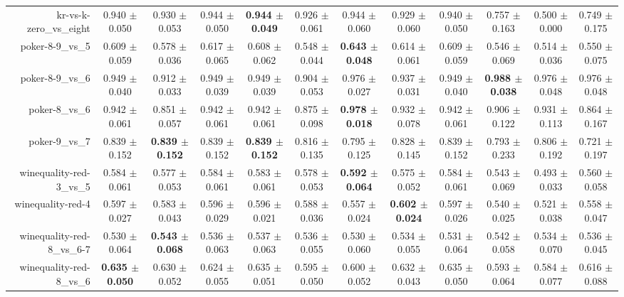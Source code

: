 \begin{table}[!ht]
{\begin{tabular}{r c c c c c c c c c c c}
kr-vs-k-zero\_vs\_eight & 0.940 $\pm$ 0.050 & 0.930 $\pm$ 0.053 & 0.944 $\pm$ 0.050 & \textbf{0.944 $\pm$ 0.049} & 0.926 $\pm$ 0.061 & 0.944 $\pm$ 0.060 & 0.929 $\pm$ 0.060 & 0.940 $\pm$ 0.050 & 0.757 $\pm$ 0.163 & 0.500 $\pm$ 0.000 & 0.749 $\pm$ 0.175 \\
poker-8-9\_vs\_5 & 0.609 $\pm$ 0.059 & 0.578 $\pm$ 0.036 & 0.617 $\pm$ 0.065 & 0.608 $\pm$ 0.062 & 0.548 $\pm$ 0.044 & \textbf{0.643 $\pm$ 0.048} & 0.614 $\pm$ 0.061 & 0.609 $\pm$ 0.059 & 0.546 $\pm$ 0.069 & 0.514 $\pm$ 0.036 & 0.550 $\pm$ 0.075 \\
poker-8-9\_vs\_6 & 0.949 $\pm$ 0.040 & 0.912 $\pm$ 0.033 & 0.949 $\pm$ 0.039 & 0.949 $\pm$ 0.039 & 0.904 $\pm$ 0.053 & 0.976 $\pm$ 0.027 & 0.937 $\pm$ 0.031 & 0.949 $\pm$ 0.040 & \textbf{0.988 $\pm$ 0.038} & 0.976 $\pm$ 0.048 & 0.976 $\pm$ 0.048 \\
poker-8\_vs\_6 & 0.942 $\pm$ 0.061 & 0.851 $\pm$ 0.057 & 0.942 $\pm$ 0.061 & 0.942 $\pm$ 0.061 & 0.875 $\pm$ 0.098 & \textbf{0.978 $\pm$ 0.018} & 0.932 $\pm$ 0.078 & 0.942 $\pm$ 0.061 & 0.906 $\pm$ 0.122 & 0.931 $\pm$ 0.113 & 0.864 $\pm$ 0.167 \\
poker-9\_vs\_7 & 0.839 $\pm$ 0.152 & \textbf{0.839 $\pm$ 0.152} & 0.839 $\pm$ 0.152 & \textbf{0.839 $\pm$ 0.152} & 0.816 $\pm$ 0.135 & 0.795 $\pm$ 0.125 & 0.828 $\pm$ 0.145 & 0.839 $\pm$ 0.152 & 0.793 $\pm$ 0.233 & 0.806 $\pm$ 0.192 & 0.721 $\pm$ 0.197 \\
winequality-red-3\_vs\_5 & 0.584 $\pm$ 0.061 & 0.577 $\pm$ 0.053 & 0.584 $\pm$ 0.061 & 0.583 $\pm$ 0.061 & 0.578 $\pm$ 0.053 & \textbf{0.592 $\pm$ 0.064} & 0.575 $\pm$ 0.052 & 0.584 $\pm$ 0.061 & 0.543 $\pm$ 0.069 & 0.493 $\pm$ 0.033 & 0.560 $\pm$ 0.058 \\
winequality-red-4 & 0.597 $\pm$ 0.027 & 0.583 $\pm$ 0.043 & 0.596 $\pm$ 0.029 & 0.596 $\pm$ 0.021 & 0.588 $\pm$ 0.036 & 0.557 $\pm$ 0.024 & \textbf{0.602 $\pm$ 0.024} & 0.597 $\pm$ 0.026 & 0.540 $\pm$ 0.025 & 0.521 $\pm$ 0.038 & 0.558 $\pm$ 0.047 \\
winequality-red-8\_vs\_6-7 & 0.530 $\pm$ 0.064 & \textbf{0.543 $\pm$ 0.068} & 0.536 $\pm$ 0.063 & 0.537 $\pm$ 0.063 & 0.536 $\pm$ 0.055 & 0.530 $\pm$ 0.060 & 0.534 $\pm$ 0.055 & 0.531 $\pm$ 0.064 & 0.542 $\pm$ 0.058 & 0.534 $\pm$ 0.070 & 0.536 $\pm$ 0.045 \\
winequality-red-8\_vs\_6 & \textbf{0.635 $\pm$ 0.050} & 0.630 $\pm$ 0.052 & 0.624 $\pm$ 0.055 & 0.635 $\pm$ 0.051 & 0.595 $\pm$ 0.050 & 0.600 $\pm$ 0.052 & 0.632 $\pm$ 0.043 & 0.635 $\pm$ 0.050 & 0.593 $\pm$ 0.064 & 0.584 $\pm$ 0.077 & 0.616 $\pm$ 0.088 \\

\end{tabular}}
\end{table}
